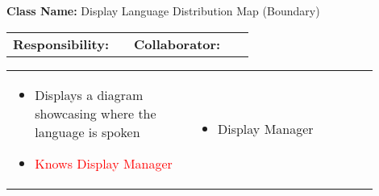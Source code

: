 \begin{cards}[]
    \textbf{Class Name:} Display Language Distribution Map (Boundary)
    \tcbline
    \begin{tabular}{p{0.45\linewidth} | p{0.45\linewidth}}
        \textbf{Responsibility:}& 
        \textbf{Collaborator:}\\
    \end{tabular}
    \tcbline
    \begin{tabular}{p{0.45\linewidth} | p{0.45\linewidth}}
        \begin{itemize}
            \item Displays a diagram showcasing where the language is spoken
            \item \textcolor{red}{Knows Display Manager}
        \end{itemize}
        &
        \begin{itemize}
            \item Display Manager
        \end{itemize}
    \end{tabular}
\end{cards}